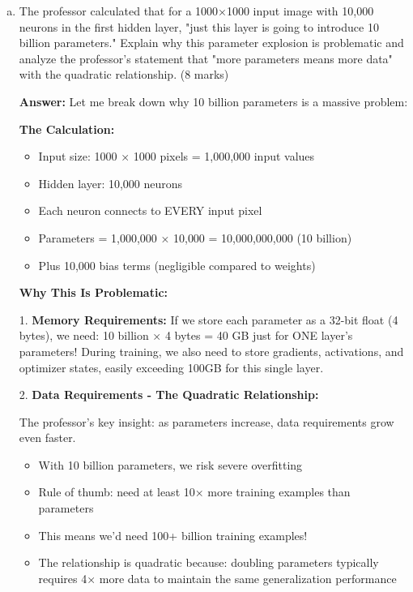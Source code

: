 \documentclass[12pt]{article}
\newcommand{\answer}[1]{{\color{answercolor}\textbf{Answer:} #1}}
\newcommand{\explanation}[1]{{\color{explanationcolor}#1}}
\begin{document}
\begin{enumerate}[(a)]
    \item The professor calculated that for a 1000×1000 input image with 10,000 neurons in the first hidden layer, "just this layer is going to introduce 10 billion parameters." Explain why this parameter explosion is problematic and analyze the professor's statement that "more parameters means more data" with the quadratic relationship. \hfill (8 marks)
    
    \answer{
    Let me break down why 10 billion parameters is a massive problem:
    
    \textbf{The Calculation:}
    \begin{itemize}
        \item Input size: 1000 × 1000 pixels = 1,000,000 input values
        \item Hidden layer: 10,000 neurons
        \item Each neuron connects to EVERY input pixel
        \item Parameters = 1,000,000 × 10,000 = 10,000,000,000 (10 billion)
        \item Plus 10,000 bias terms (negligible compared to weights)
    \end{itemize}
    
    \textbf{Why This Is Problematic:}
    
    1. \textbf{Memory Requirements:}
    \explanation{
    If we store each parameter as a 32-bit float (4 bytes), we need:
    10 billion × 4 bytes = 40 GB just for ONE layer's parameters!
    During training, we also need to store gradients, activations, and optimizer states, easily exceeding 100GB for this single layer.
    }
    
    2. \textbf{Data Requirements - The Quadratic Relationship:}
    \explanation{
    The professor's key insight: as parameters increase, data requirements grow even faster.
    \begin{itemize}
        \item With 10 billion parameters, we risk severe overfitting
        \item Rule of thumb: need at least 10× more training examples than parameters
        \item This means we'd need 100+ billion training examples!
        \item The relationship is quadratic because: doubling parameters typically requires 4× more data to maintain the same generalization performance
    \end{itemize}
    }
    
}
\end{enumerate}
\end{document}
